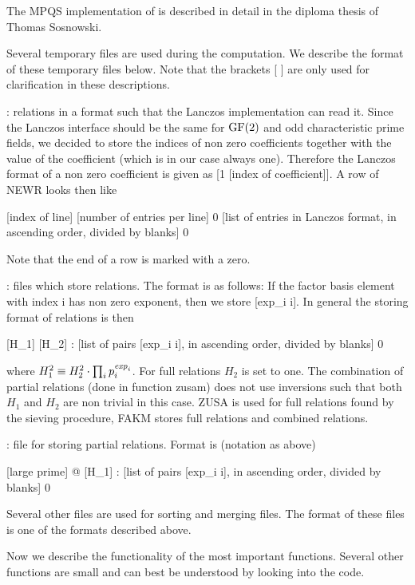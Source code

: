 \begin{techdoc}
  The MPQS implementation of \LiDIA is described in detail in the diploma thesis of Thomas
  Sosnowski.
  
  Several temporary files are used during the computation.  We describe the format of these
  temporary files below.  Note that the brackets [ ] are only used for clarification in these
  descriptions.
  
  : relations in a format such that the Lanczos implementation can read it.  Since the
  Lanczos interface should be the same for $\mathrm{GF}(2)$ and odd characteristic prime fields, we
  decided to store the indices of non zero coefficients together with the value of the
  coefficient (which is in our case always one).  Therefore the Lanczos format of a non zero
  coefficient is given as [1 [index of coefficient]].  A row of NEWR looks then like
  
  [index of line] [number of entries per line] 0 [list of entries in Lanczos format, in
  ascending order, divided by blanks] 0
  
  Note that the end of a row is marked with a zero.
  
  : files which store relations.  The format is as follows: If the factor basis
  element with index i has non zero exponent, then we store [exp\_i i].  In general the storing
  format of relations is then
  
  [H\_1] [H\_2] : [list of pairs [exp\_i i], in ascending order, divided by blanks] 0
  
  where $H_1^2 \equiv H_2^2 \cdot \prod_{i} p_i^{\mathit{exp}_i}$.  For full relations $H_2$ is set to
  one.  The combination of partial relations (done in function zusam) does not use inversions
  such that both $H_1$ and $H_2$ are non trivial in this case.  ZUSA is used for full relations
  found by the sieving procedure, FAKM stores full relations and combined relations.
  
  : file for storing partial relations.  Format is (notation as above)
  
  [large prime] @ [H\_1] : [list of pairs [exp\_i i], in ascending order, divided by blanks] 0
  
  Several other files are used for sorting and merging files.  The format of these files is one
  of the formats described above.
  
  Now we describe the functionality of the most important functions.  Several other functions
  are small and can best be understood by looking into the code.
  

\end{techdoc}
